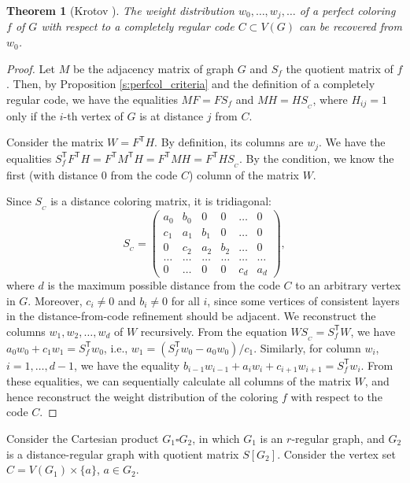 \documentclass[11pt]{article}
\newtheorem{theorem}{Theorem}[section]
\theoremstyle{definition}
\begin{document}
{{\begin{theorem}[Krotov \cite{Krotov11}]
The weight distribution $w_0,\dots,w_j,\dots$ of a perfect coloring
$f$ of  $G$ with respect to a completely regular code $C\subset
V(G)$ can be recovered from $w_0$.
\end{theorem}
\begin{proof}
Let $M$ be the adjacency matrix of graph $G$ and $S_f$ the quotient matrix of
 $f$. Then, by Proposition \ref{s:perfcol_criteria} and
the definition of a completely regular code, we have the equalities $MF=FS_f$ and
$MH=HS_{_C}$, where $H_{ij}=1$ only if the $i$-th vertex of $G$
is at distance $j$ from  $C$.

Consider the matrix $W=F^{\mathsf T}H$. By definition, its columns
are  $w_j$. We have the equalities $S_f^{\mathsf T}F^{\mathsf T}H=F^{\mathsf T}M^{\mathsf T}H=F^{\mathsf T}MH=F^{\mathsf T}HS_{_C}$. By the condition, we know the first (with
distance $0$ from the code $C$) column of the matrix $W$.

Since $S_{_C}$ is a distance coloring matrix, it is
tridiagonal: $$S_{_C}=\begin{pmatrix}
a_0 & b_0 & 0 & 0& \dots & 0\\
c_1 & a_1 & b_1 & 0 & \dots & 0\\
0 & c_2 & a_2 & b_2 & \dots & 0 \\
\dots & \dots & \dots & \dots & \dots & \dots \\
0 & \dots & 0 & 0 & c_d & a_d
\end{pmatrix},$$ where $d$ is the maximum possible distance from the code
$C$ to an arbitrary vertex in $G$. Moreover, $c_i\neq 0$ and
$b_i\neq 0$ for all $i$, since some vertices of consistent layers in
the distance-from-code refinement should be adjacent. We reconstruct the  columns $w_1,w_2,\dots,w_d$ of  $W$ recursively. From
the equation $WS_{_C}=S_f^{\mathsf T}W$, we have
$a_0w_0+c_1w_1=S_f^{\mathsf T}w_0$, i.e., $w_1=(S_f^{\mathsf T}w_0 - a_0w_0)/c_1$. Similarly, for column $w_i$,
$i=1,\dots,d-1$, we have the equality
$b_{i-1}w_{i-1}+a_iw_i+c_{i+1}w_{i+1}=S_f^{\mathsf T}w_i$. From
these equalities, we can sequentially calculate all columns of the matrix
$W$, and hence reconstruct the weight distribution of the coloring $f$
with respect to the code $C$.
\end{proof}






Consider the Cartesian product $G_1\square G_2$, in which
$G_1$ is an $r$-regular graph, and
$G_2$ is a distance-regular graph with quotient matrix
$S[G_2]$. Consider the vertex set $C=V(G_1)\times \{a\}$, $a\in
G_2$.

}}
\end{document}
